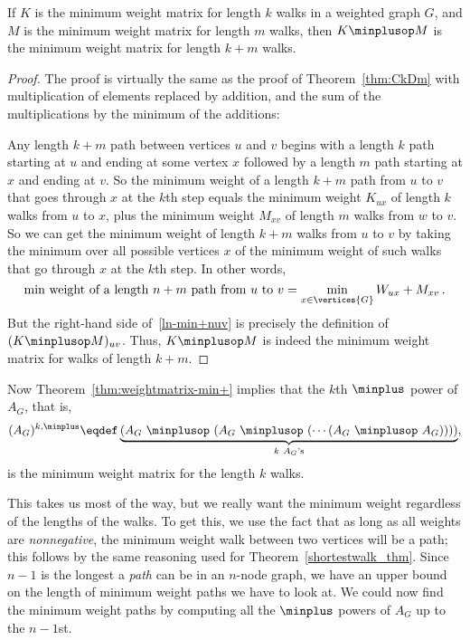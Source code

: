 \begin{theorem}\label{thm:weightmatrix-min+}
  If $K$ is the minimum weight matrix for length $k$ walks in a
  weighted graph $G$, and $M$ is the minimum weight matrix for length
  $m$ walks, then $K \minplusop M$ is the minimum weight matrix for
  length $k+m$ walks.
\end{theorem}

\begin{proof}
  The proof is virtually the same as the proof of Theorem~\ref{thm:CkDm}
  with multiplication of elements replaced by addition, and the sum of the
  multiplications by the minimum of the additions:

  Any length $k+m$ path between vertices $u$ and $v$ begins with a length
  $k$ path starting at $u$ and ending at some vertex $x$ followed by a
  length $m$ path starting at $x$ and ending at $v$.  So the minimum
  weight of a length $k+m$ path from $u$ to $v$ that goes through $x$ at
  the $k$th step equals the minimum weight $K_{ux}$ of length $k$ walks
  from $u$ to $x$, plus the minimum weight $M_{xv}$ of length $m$ walks
  from $w$ to $v$.  So we can get the minimum weight of length $k+m$ walks
  from $u$ to $v$ by taking the minimum over all possible vertices $x$ of
  the minimum weight of such walks that go through $x$ at the $k$th step.
  In other words,
\begin{equation}\label{ln-min+nuv}
\text{min weight of a length $n+m$ path from $u$ to $v$} =
              \min_{x \in \vertices{G}} W_{ux}+M_{xv}\, .
\end{equation}
But the right-hand side of~\eqref{ln-min+nuv} is precisely the
definition of $(K \minplusop M)_{uv}$.  Thus, $K \minplusop M$ is
indeed the minimum weight matrix for walks of length $k+m$.
\end{proof}

Now Theorem~\ref{thm:weightmatrix-min+} implies that the $k$th $\minplus$ power
of $A_G$, that is,
\[
(A_G)^{k, \minplus} \eqdef \underbrace{(A_G\ \minplusop\ (A_G\
      \minplusop\ (\cdots (A_G\ \minplusop\ A_G)) ))}_{k\ A_G\text{'s}},
\]
is the minimum weight matrix for the length $k$ walks.

This takes us most of the way, but we really want the minimum weight
regardless of the lengths of the walks.  To get this, we use the fact
that as long as all weights are \emph{nonnegative}, the minimum weight
walk between two vertices will be a path; this follows by the same
reasoning used for Theorem~\ref{shortestwalk_thm}.  Since $n-1$ is the
longest a \emph{path} can be in an $n$-node graph, we have an upper
bound on the length of minimum weight paths we have to look at.  We
could now find the minimum weight paths by computing all the
$\minplus$ powers of $A_G$ up to the $n-1$st.

